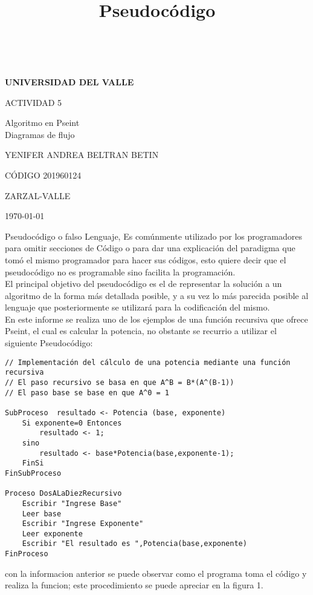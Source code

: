 \documentclass[letterpaper,12pt]{article}
\title{Pseudocódigo }
\date{} %
\begin{document}
\ \ %

\begin{titlepage}
	\centering
	{\scshape\LARGE\bfseries   UNIVERSIDAD DEL VALLE \par}\vspace{1cm}
	\vspace{2.5cm}
	{\scshape\Large  ACTIVIDAD 5\par}
	\vspace{2.5cm}
	{\huge Algoritmo en Pseint\\Diagramas de flujo\par} %
	\vspace{2cm}
	{\Large YENIFER ANDREA BELTRAN BETIN\par} %
{\Large  CÓDIGO 201960124\par}%
	\vspace{2.5cm}
	\vfill
	ZARZAL-VALLE\par
	

	\vfill

	{\large \today\par}
\end{titlepage}
\maketitle
 Pseudocódigo o falso Lenguaje, Es comúnmente utilizado por los programadores para omitir secciones de Código o para dar una explicación del paradigma que tomó el mismo programador para hacer sus códigos, esto quiere decir que el pseudocódigo no es programable sino facilita la programación.\\
El principal objetivo del pseudocódigo es el de representar la solución a un algoritmo de la forma más detallada posible, y a su vez lo más parecida posible al lenguaje que posteriormente se utilizará para la codificación del mismo.\\
En este informe se realiza uno de los ejemplos de una función recursiva que ofrece Pseint, el cual es calcular la  potencia, no obstante se recurrio a utilizar el siguiente Pseudocódigo:

\begin{verbatim}
// Implementación del cálculo de una potencia mediante una función recursiva
// El paso recursivo se basa en que A^B = B*(A^(B-1))
// El paso base se base en que A^0 = 1

SubProceso  resultado <- Potencia (base, exponente)
    Si exponente=0 Entonces
        resultado <- 1;
    sino 
        resultado <- base*Potencia(base,exponente-1); 
    FinSi
FinSubProceso

Proceso DosALaDiezRecursivo
    Escribir "Ingrese Base"
    Leer base
    Escribir "Ingrese Exponente"
    Leer exponente
    Escribir "El resultado es ",Potencia(base,exponente)
FinProceso
\end{verbatim}
con la informacion anterior se puede observar como el programa toma el código y realiza la funcion; este procedimiento se puede apreciar en la figura 1. 
\end{document}
